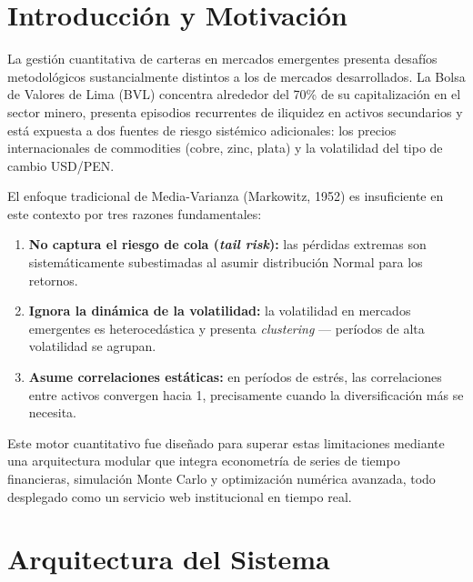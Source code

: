 \documentclass[11pt,a4paper]{article}
\begin{document}
\tableofcontents
\newpage

\section{Introducción y Motivación}

La gestión cuantitativa de carteras en mercados emergentes presenta desafíos metodológicos
sustancialmente distintos a los de mercados desarrollados. La Bolsa de Valores de Lima (BVL)
concentra alrededor del 70\% de su capitalización en el sector minero, presenta episodios
recurrentes de iliquidez en activos secundarios y está expuesta a dos fuentes de riesgo
sistémico adicionales: los precios internacionales de commodities (cobre, zinc, plata) y
la volatilidad del tipo de cambio USD/PEN.

El enfoque tradicional de Media-Varianza (Markowitz, 1952) es insuficiente en este contexto
por tres razones fundamentales:

\begin{enumerate}[leftmargin=*]
    \item \textbf{No captura el riesgo de cola (\textit{tail risk}):} las pérdidas extremas son
    sistemáticamente subestimadas al asumir distribución Normal para los retornos.
    \item \textbf{Ignora la dinámica de la volatilidad:} la volatilidad en mercados emergentes es
    heterocedástica y presenta \textit{clustering} — períodos de alta volatilidad se agrupan.
    \item \textbf{Asume correlaciones estáticas:} en períodos de estrés, las correlaciones entre
    activos convergen hacia 1, precisamente cuando la diversificación más se necesita.
\end{enumerate}

Este motor cuantitativo fue diseñado para superar estas limitaciones mediante una arquitectura
modular que integra econometría de series de tiempo financieras, simulación Monte Carlo y
optimización numérica avanzada, todo desplegado como un servicio web institucional en tiempo real.

\section{Arquitectura del Sistema}
\end{document}

